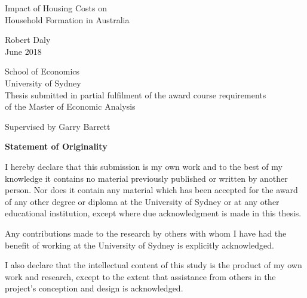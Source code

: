 \documentclass[12pt]{article}
\newcommand{\heading}[1] {\begin{center} \textbf{#1} \end{center}}
\begin{document}
\begin{titlepage}
    \begin{center}
        \vspace*{2cm}

        \huge
        Impact of Housing Costs on \\Household Formation in Australia
        \vspace{2cm}

        \large
        Robert Daly\\
        \vspace{1cm}
        June 2018 \\

        \vspace{1cm}

        School of Economics\\
        University of Sydney\\

        \vspace{1cm}
        Thesis submitted in partial fulfilment of the award course requirements \\
        of the Master of Economic Analysis

        \vspace{1cm}
        Supervised by  Garry Barrett

        \normalsize

    \end{center}
\end{titlepage}

\pagebreak
\heading{Statement of Originality}
I hereby declare that this submission is my own work and to the best of my knowledge it contains no material previously published or written by another person.  Nor does it contain any material which has been accepted for the award of any other degree or diploma at the University of Sydney or at any other educational institution, except where due acknowledgment is made in this thesis.

Any contributions made to the research by others with whom I have had the benefit of working at the University of Sydney is explicitly acknowledged.

I also declare that the intellectual content of this study is the product of my own work and research, except to the extent that assistance from others in the project’s conception and design is acknowledged.

\vspace{2.0cm}
\end{document}
